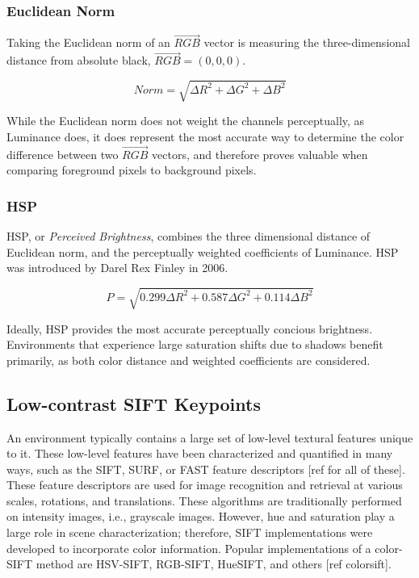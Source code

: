 \documentclass[12pt]{report}
\begin{document}
\subsubsection{Euclidean Norm}

Taking the Euclidean norm of an $\vec{RGB}$ vector is measuring the three-dimensional distance from absolute black, $\vec{RGB} = (0,0,0)$. 

\begin{equation}
Norm = \sqrt{\Delta R^2 + \Delta G^2 + \Delta B^2}
\end{equation}

While the Euclidean norm does not weight the channels perceptually, as Luminance does, it does represent the most accurate way to determine the color difference between two $\vec{RGB}$ vectors, and therefore proves valuable when comparing foreground pixels to background pixels. 

\subsubsection{HSP}

HSP, or \textit{Perceived Brightness}, combines the three dimensional distance of Euclidean norm, and the perceptually weighted coefficients of Luminance. HSP was introduced by Darel Rex Finley in 2006.

\begin{equation}
P = \sqrt{0.299\Delta R^2 + 0.587\Delta G^2 + 0.114\Delta B^2}
\end{equation}

Ideally, HSP provides the most accurate perceptually concious brightness. Environments that experience large saturation shifts due to shadows benefit primarily, as both color distance and weighted coefficients are considered.

\subsection{Low-contrast SIFT Keypoints} \label{lowcSIFT}

An environment typically contains a large set of low-level textural features unique to it. These low-level features have been characterized and quantified in many ways, such as the SIFT, SURF, or FAST feature descriptors [ref for all of these]. These feature descriptors are used for image recognition and retrieval at various scales, rotations, and translations. These algorithms are traditionally performed on intensity images, i.e., grayscale images. However, hue and saturation play a large role in scene characterization; therefore, SIFT implementations were developed to incorporate color information. Popular implementations of a color-SIFT method are HSV-SIFT, RGB-SIFT, HueSIFT, and others [ref colorsift].
\end{document}
